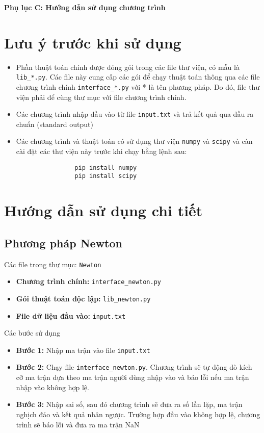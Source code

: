 \documentclass[12pt,a4paper]{article}
\begin{document}
    {\LARGE \textbf{Phụ lục C: Hướng dẫn sử dụng chương trình}}

    \section{Lưu ý trước khi sử dụng}

        \begin{itemize}
            \item Phần thuật toán chính được đóng gói trong các file thư viện, có mẫu là \texttt{lib\_*.py}. Các file này cung cấp các gói để chạy thuật toán thông qua các file chương trình chính \texttt{interface\_*.py} với * là tên phương pháp. Do đó, file thư viện phải để cùng thư mục với file chương trình chính.
            \item Các chương trình nhập đầu vào từ file \texttt{input.txt} và trả kết quả qua đầu ra chuẩn (standard output)
            \item Các chương trình và thuật toán có sử dụng thư viện \texttt{numpy} và \texttt{scipy} và càn cài đặt các thư viện này trước khi chạy bằng lệnh sau:
            \begin{verbatim}
                pip install numpy
                pip install scipy
            \end{verbatim}
        \end{itemize}

    \section{Hướng dẫn sử dụng chi tiết}

    \subsection{Phương pháp Newton}
    
    \par Các file trong thư mục: \texttt{Newton}
    \begin{itemize}
        \item \textbf{Chương trình chính:} \texttt{interface\_newton.py}
        \item \textbf{Gói thuật toán độc lập:} \texttt{lib\_newton.py}
        \item \textbf{File dữ liệu đầu vào:} \texttt{input.txt}
    \end{itemize}
    
    \par Các bước sử dụng
    \begin{itemize}
        \item \textbf{Bước 1:} Nhập ma trận vào file \texttt{input.txt}
        \item \textbf{Bước 2:} Chạy file \texttt{interface\_newton.py}. Chương trình sẽ tự động dò kích cỡ ma trận dựa theo ma trận người dùng nhập vào và báo lỗi nếu ma trận nhập vào không hợp lệ.
        \item \textbf{Bước 3:} Nhập sai số, sau đó chương trình sẽ đưa ra số lần lặp, ma trận nghịch đảo và kết quả nhân ngược. Trường hợp đầu vào không hợp lệ, chương trình sẽ báo lỗi và đưa ra ma trận NaN
    \end{itemize}
\end{document}
